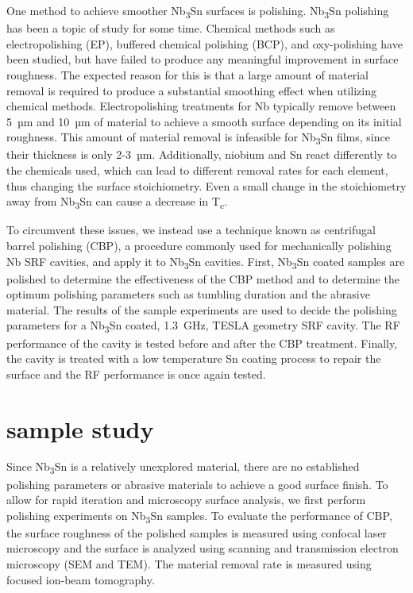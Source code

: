 \documentclass[reprint,amsmath,amssymb,aps]{revtex4-2}%
\begin{document}
One method to achieve smoother Nb\textsubscript{3}Sn surfaces is polishing. Nb\textsubscript{3}Sn polishing has been a topic of study for some time. Chemical methods such as electropolishing (EP)\cite{pudasaini2018studies,pudasaini2017post,hu2019reducing}, buffered chemical polishing (BCP)\cite{pudasaini2017post,hu2019reducing}, and oxy-polishing\cite{pudasaini2017post,pudasaini2018studies} have been studied, but have failed to produce any meaningful improvement in surface roughness. The expected reason for this is that a large amount of material removal is required to produce a substantial smoothing effect when utilizing chemical methods. Electropolishing treatments for Nb typically remove between 5~µm and 10~µm of material to achieve a smooth surface depending on its initial roughness. This amount of material removal is infeasible for Nb\textsubscript{3}Sn films, since their thickness is only 2-3~µm. Additionally, niobium and Sn react differently to the chemicals used, which can lead to different removal rates for each element, thus changing the surface stoichiometry. Even a small change in the stoichiometry away from Nb\textsubscript{3}Sn can cause a decrease in T\textsubscript{c}\cite{sitaraman2021effect}.

To circumvent these issues, we instead use a technique known as centrifugal barrel polishing (CBP), a procedure commonly used for mechanically polishing Nb SRF cavities, and apply it to Nb\textsubscript{3}Sn cavities. First, Nb\textsubscript{3}Sn coated samples are polished to determine the effectiveness of the CBP method and to determine the optimum polishing parameters such as tumbling duration and the abrasive material. The results of the sample experiments are used to decide the polishing parameters for a Nb\textsubscript{3}Sn coated, 1.3~GHz, TESLA geometry SRF cavity. The RF performance of the cavity is tested before and after the CBP treatment. Finally, the cavity is treated with a low temperature Sn coating process to repair the surface and the RF performance is once again tested.

%
\section{sample study}%
\label{sec:samplestudy}%
Since Nb\textsubscript{3}Sn is a relatively unexplored material, there are no established polishing parameters or abrasive materials to achieve a good surface finish. To allow for rapid iteration and microscopy surface analysis, we first perform polishing experiments on Nb\textsubscript{3}Sn samples. To evaluate the performance of CBP, the surface roughness of the polished samples is measured using confocal laser microscopy and the surface is analyzed using scanning and transmission electron microscopy (SEM and TEM). The material removal rate is measured using focused ion-beam tomography.
\end{document}
